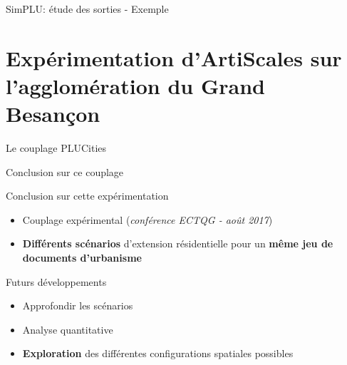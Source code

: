 \documentclass[xcolor=table]{beamer}
\newcommand\FontPetit{\fontsize{8}{6}\selectfont}
\begin{document}
\begin{frame}{SimPLU: étude des sorties - Exemple}
	\\
	\FontPetit{}
\end{frame}





\section[Expérimentation]{Expérimentation d'ArtiScales sur l'agglomération du Grand Besançon}





\begin{frame}{Le couplage PLUCities}
	\FontPetit{}
\end{frame}


\begin{frame}{Conclusion sur ce couplage}
	\begin{block}{Conclusion sur cette expérimentation}		
		\begin{itemize}
			\item Couplage expérimental (\textit{conférence ECTQG - août 2017})
			\item \textbf{Différents scénarios} d'extension résidentielle pour un \textbf{même jeu de documents d'urbanisme}
		\end{itemize}
	\end{block}
	\begin{block}{Futurs développements}		
		\begin{itemize}
			\item Approfondir les scénarios
			\item Analyse quantitative
			\item \textbf{Exploration} des différentes configurations spatiales possibles
		\end{itemize}
	\end{block}
\end{frame}
\end{document}
